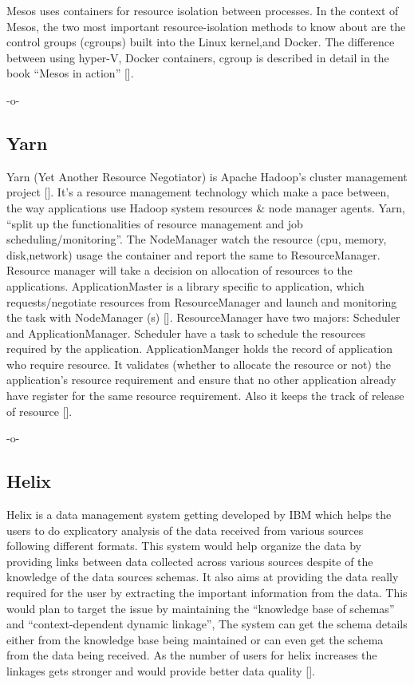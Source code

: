 Mesos uses containers for resource isolation between processes. In the
context of Mesos, the two most important resource-isolation methods to
know about are the control groups (cgroups) built into the Linux
kernel,and Docker. The difference between using hyper-V, Docker
containers, cgroup is described in detail in the book ``Mesos in
action'' [\cite{book-mesos-Ignazio-2016}].

     -o-


\subsection{Yarn}

Yarn (Yet Another Resource Negotiator) is Apache Hadoop's cluster
management project [\cite{www-cloudera}]. It's a resource management
technology which make a pace between, the way applications use Hadoop
system resources \& node manager agents. Yarn, ``split up the
functionalities of resource management and job
scheduling/monitoring''. The NodeManager watch the resource (cpu,
memory, disk,network) usage the container and report the same to
ResourceManager. Resource manager will take a decision on allocation
of resources to the applications. ApplicationMaster is a library
specific to application, which requests/negotiate resources from
ResourceManager and launch and monitoring the task with NodeManager
(s) [\cite{www-architecture}].  ResourceManager have two majors:
Scheduler and ApplicationManager. Scheduler have a task to schedule
the resources required by the application. ApplicationManger holds the
record of application who require resource. It validates (whether to
allocate the resource or not) the application's resource requirement
and ensure that no other application already have register for the
same resource requirement. Also it keeps the track of release of
resource [\cite{www-HadoopApache}].

     -o-

\subsection{Helix}

Helix is a data management system getting developed by IBM which helps
the users to do explicatory analysis of the data received from various
sources following different formats. This system would help organize
the data by providing links between data collected across various
sources despite of the knowledge of the data sources schemas. It also
aims at providing the data really required for the user by extracting
the important information from the data. This would plan to target the
issue by maintaining the ``knowledge base of schemas'' and
``context-dependent dynamic linkage'', The system can get the schema
details either from the knowledge base being maintained or can even
get the schema from the data being received. As the number of users
for helix increases the linkages gets stronger and would provide
better data quality [\cite{www-ibm-helix-paper}].


